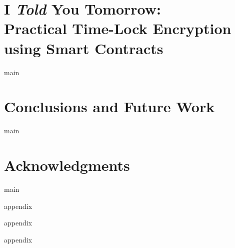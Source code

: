 \documentclass[12pt,a4paper,oldfontcommands,openright]{memoir}
\begin{document}
\chapter[I Told You Tomorrow]{I {\em Told} You Tomorrow:\\Practical Time-Lock Encryption using Smart Contracts}
\label{chap:ityt}
{main}

\chapter[Conclusions]{Conclusions and Future Work}
\label{chap:conclusions}
{main}



\chapter*{Acknowledgments}
\label{chap:acknowledgments}
{main}










\appendix

{appendix}

{appendix}

{appendix}
\end{document}
